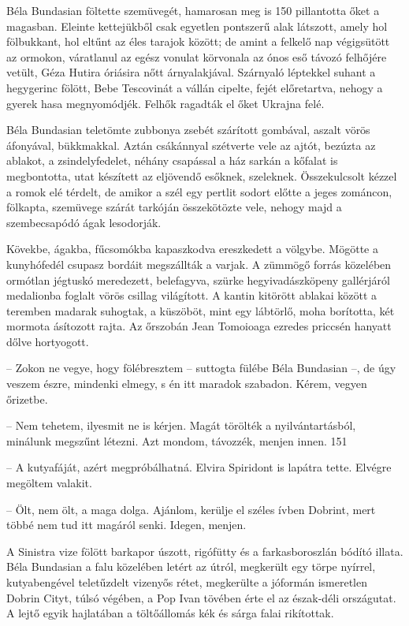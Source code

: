 \documentclass{IEEEtran}
\begin{document}
Béla Bundasian föltette szemüvegét, hamarosan meg is 150 pillantotta őket a
magasban. Eleinte kettejükből csak egyetlen pontszerű alak látszott, amely hol
fölbukkant, hol eltűnt az éles tarajok között; de amint a felkelő nap
végigsütött az ormokon, váratlanul az egész vonulat körvonala az ónos eső
távozó felhőjére vetült, Géza Hutira óriásira nőtt árnyalakjával. Szárnyaló
léptekkel suhant a hegygerinc fölött, Bebe Tescovinát a vállán cipelte, fejét
előretartva, nehogy a gyerek hasa megnyomódjék. Felhők ragadták el őket
Ukrajna felé.

Béla Bundasian teletömte zubbonya zsebét szárított gombával, aszalt vörös
áfonyával, bükkmakkal. Aztán csákánnyal szétverte vele az ajtót, bezúzta az
ablakot, a zsindelyfedelet, néhány csapással a ház sarkán a kőfalat is
megbontotta, utat készített az eljövendő esőknek, szeleknek. Összekulcsolt
kézzel a romok elé térdelt, de amikor a szél egy pertlit sodort előtte a jeges
zománcon, fölkapta, szemüvege szárát tarkóján összekötözte vele, nehogy majd a
szembecsapódó ágak lesodorják.

Kövekbe, ágakba, fűcsomókba kapaszkodva ereszkedett a völgybe. Mögötte a
kunyhófedél csupasz bordáit megszállták a varjak. A zümmögő forrás közelében
ormótlan jégtuskó meredezett, belefagyva, szürke hegyivadászköpeny gallérjáról
medalionba foglalt vörös csillag világított. A kantin kitörött ablakai között
a teremben madarak suhogtak, a küszöböt, mint egy lábtörlő, moha borította,
két mormota ásítozott rajta. Az őrszobán Jean Tomoioaga ezredes priccsén
hanyatt dőlve hortyogott.

– Zokon ne vegye, hogy fölébresztem – suttogta fülébe Béla Bundasian –, de úgy
veszem észre, mindenki elmegy, s én itt maradok szabadon. Kérem, vegyen
őrizetbe.

– Nem tehetem, ilyesmit ne is kérjen. Magát törölték a nyilvántartásból,
minálunk megszűnt létezni. Azt mondom, távozzék, menjen innen.
151

– A kutyafáját, azért megpróbálhatná. Elvira Spiridont is lapátra tette.
Elvégre megöltem valakit.

– Ölt, nem ölt, a maga dolga. Ajánlom, kerülje el széles ívben Dobrint, mert
többé nem tud itt magáról senki. Idegen, menjen.

A Sinistra vize fölött barkapor úszott, rigófütty és a farkasboroszlán bódító
illata. Béla Bundasian a falu közelében letért az útról, megkerült egy törpe
nyírrel, kutyabengével teletűzdelt vizenyős rétet, megkerülte a jóformán
ismeretlen Dobrin Cityt, túlsó végében, a Pop Ivan tövében érte el az
észak-déli országutat. A lejtő egyik hajlatában a töltőállomás kék és sárga
falai rikítottak.
\end{document}
